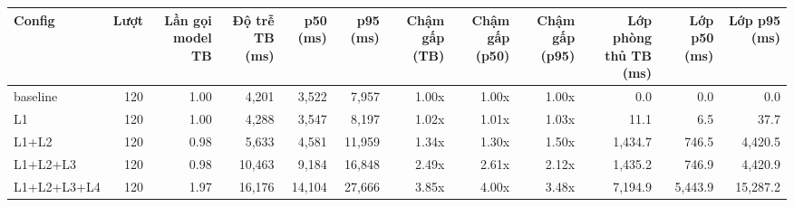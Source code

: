 \begin{tabular}{lrrrrrrrrrrr}
\toprule
Config & Lượt & Lần gọi model TB & Độ trễ TB (ms) & p50 (ms) & p95 (ms) & Chậm gấp (TB) & Chậm gấp (p50) & Chậm gấp (p95) & Lớp phòng thủ TB (ms) & Lớp p50 (ms) & Lớp p95 (ms) \\
\midrule
baseline & 120 & 1.00 & 4,201 & 3,522 & 7,957 & 1.00x & 1.00x & 1.00x & 0.0 & 0.0 & 0.0 \\
L1 & 120 & 1.00 & 4,288 & 3,547 & 8,197 & 1.02x & 1.01x & 1.03x & 11.1 & 6.5 & 37.7 \\
L1+L2 & 120 & 0.98 & 5,633 & 4,581 & 11,959 & 1.34x & 1.30x & 1.50x & 1,434.7 & 746.5 & 4,420.5 \\
L1+L2+L3 & 120 & 0.98 & 10,463 & 9,184 & 16,848 & 2.49x & 2.61x & 2.12x & 1,435.2 & 746.9 & 4,420.9 \\
L1+L2+L3+L4 & 120 & 1.97 & 16,176 & 14,104 & 27,666 & 3.85x & 4.00x & 3.48x & 7,194.9 & 5,443.9 & 15,287.2 \\
\bottomrule
\end{tabular}
